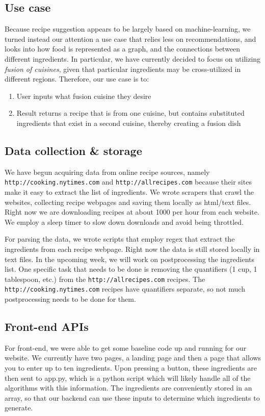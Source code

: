 \documentclass{article}
\begin{document}
\subsection{Use case}
Because recipe suggestion appears to be largely based on machine-learning, we turned instead
our attention a use case that relies less on recommendations, and looks into how
food is represented as a graph, and the connections between different ingredients. In particular,
we have currently decided to focus on utilizing \textit{fusion of cuisines}, given that
particular ingredients may be cross-utilized in different regions. Therefore, our use case is to:
\begin{enumerate}
    \item User inputs what fusion cuisine they desire
    \item Result returns a recipe that is from one cuisine, but contains substituted ingredients that
        exist in a second cuisine, thereby creating a fusion dish
\end{enumerate}


\subsection{Data collection \& storage}
We have begun acquiring data from online recipe sources, namely \texttt{http://cooking.nytimes.com} and \texttt{http://allrecipes.com} because their sites make it easy to extract the list of ingredients. We wrote scrapers that crawl the websites, collecting recipe webpages and saving them locally as html/text files. Right now we are downloading recipes at about 1000 per hour from each website. We employ a sleep timer to slow down downloads and avoid being throttled.

For parsing the data, we wrote scripts that employ regex that extract the ingredients from each recipe webpage. Right now the data is still stored locally in text files. In the upcoming week, we will work on postprocessing the ingredients list. One specific task that needs to be done is removing the quantifiers (1 cup, 1 tablespoon, etc.) from the \texttt{http://allrecipes.com} recipes. The \texttt{http://cooking.nytimes.com} recipes have quantifiers separate, so not much postprocessing needs to be done for them.


\subsection{Front-end APIs}
For front-end, we were able to get some baseline code up and running for our website. We currently have two pages, a landing page and then a page that allows you to enter up to ten ingredients. Upon pressing a button, these ingredients are then sent to app.py, which is a python script which will likely handle all of the algorithms with this information. The ingredients are conveniently stored in an array, so that our backend can use these inputs to determine which ingredients to generate.
\end{document}
